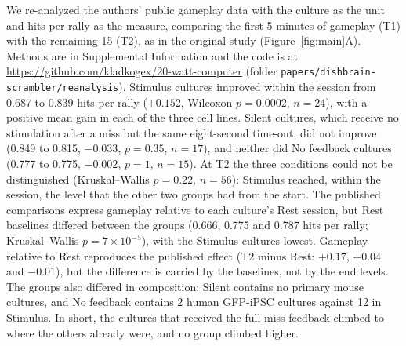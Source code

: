 \documentclass[11pt]{article}
\begin{document}
We re-analyzed the authors' public gameplay data\cite{OSF5u6qv} with the culture as the unit\cite{Aarts2014} and hits per rally as the measure, comparing the first 5 minutes of gameplay (T1) with the remaining 15 (T2), as in the original study (Figure~\ref{fig:main}A). Methods are in Supplemental Information and the code is at \url{https://github.com/kladkogex/20-watt-computer} (folder \texttt{papers/dishbrain-scrambler/reanalysis}). Stimulus cultures improved within the session from 0.687 to 0.839 hits per rally ($+0.152$, Wilcoxon $p=0.0002$, $n=24$), with a positive mean gain in each of the three cell lines. Silent cultures, which receive no stimulation after a miss but the same eight-second time-out, did not improve (0.849 to 0.815, $-0.033$, $p=0.35$, $n=17$), and neither did No feedback cultures (0.777 to 0.775, $-0.002$, $p=1$, $n=15$). At T2 the three conditions could not be distinguished (Kruskal--Wallis $p=0.22$, $n=56$): Stimulus reached, within the session, the level that the other two groups had from the start. The published comparisons express gameplay relative to each culture's Rest session, but Rest baselines differed between the groups (0.666, 0.775 and 0.787 hits per rally; Kruskal--Wallis $p=7\times10^{-5}$), with the Stimulus cultures lowest. Gameplay relative to Rest reproduces the published effect (T2 minus Rest: $+0.17$, $+0.04$ and $-0.01$), but the difference is carried by the baselines, not by the end levels. The groups also differed in composition: Silent contains no primary mouse cultures, and No feedback contains 2 human GFP-iPSC cultures against 12 in Stimulus. In short, the cultures that received the full miss feedback climbed to where the others already were, and no group climbed higher.
\end{document}
